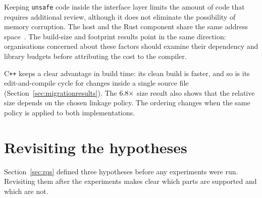\documentclass[english,oneside,a4paper,censored,csm,software-track-2020]{HYthesisML}
\begin{document}
Keeping \texttt{unsafe} code inside the interface layer limits the amount of
code that requires additional review, although it does not eliminate the
possibility of memory corruption. The host and the Rust component share the
same address space~\cite{rivera2021galeed,kirth2022pkrusafe}. The build-size
and footprint results point in the same direction: organisations concerned about
these factors should examine their dependency and library budgets before
attributing the cost to the compiler.

C\texttt{++} keeps a clear advantage in build time: its clean build is faster, and so is its
edit-and-compile cycle for changes inside a single source file
(Section~\ref{sec:migrationresults}). The
$6.8\times$ size result also shows that the relative size depends
on the chosen linkage policy. The ordering changes when the same policy is
applied to both implementations.

\section{Revisiting the hypotheses}\label{sec:hypotheses}
Section~\ref{sec:rqs} defined three hypotheses before any experiments were run.
Revisiting them after the experiments makes clear which parts are supported and
which are not.
\end{document}
